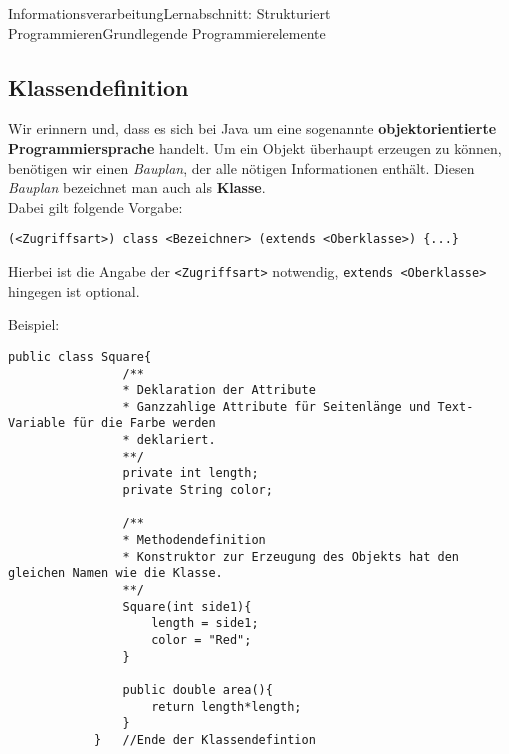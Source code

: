 \documentclass[11pt,oneside,openany,headings=optiontotoc,11pt,numbers=noenddot]{article}
\begin{document}
\begin{worksheet}{Informationsverarbeitung}{Lernabschnitt: Strukturiert Programmieren}{Grundlegende Programmierelemente}
		\subsection{Klassendefinition}
		Wir erinnern und, dass es sich bei Java um eine sogenannte \textbf{objektorientierte Programmiersprache} handelt. Um ein Objekt überhaupt erzeugen zu können, benötigen wir einen \textit{Bauplan}, der alle nötigen Informationen enthält. Diesen \textit{Bauplan} bezeichnet man auch als \textbf{Klasse}.\\
		Dabei gilt folgende Vorgabe:
		\begin{lstlisting}[style=Python]
			(<Zugriffsart>) class <Bezeichner> (extends <Oberklasse>) {...}
		\end{lstlisting}
		Hierbei ist die Angabe der \lstinline[style=Python]{<Zugriffsart>} notwendig, \lstinline[style=Python]{extends <Oberklasse>} hingegen ist optional.\\
		\par\noindent
		Beispiel:
		\begin{lstlisting}[style=Python,frame=single]
			public class Square{
				/**
				* Deklaration der Attribute
				* Ganzzahlige Attribute für Seitenlänge und Text-Variable für die Farbe werden
				* deklariert.
				**/
				private int length;
				private String color;
				
				/**
				* Methodendefinition
				* Konstruktor zur Erzeugung des Objekts hat den gleichen Namen wie die Klasse.
				**/
				Square(int side1){
					length = side1;
					color = "Red";
				}
				
				public double area(){
					return length*length;
				}
			}	//Ende der Klassendefintion
		\end{lstlisting}

\end{worksheet}
\end{document}
